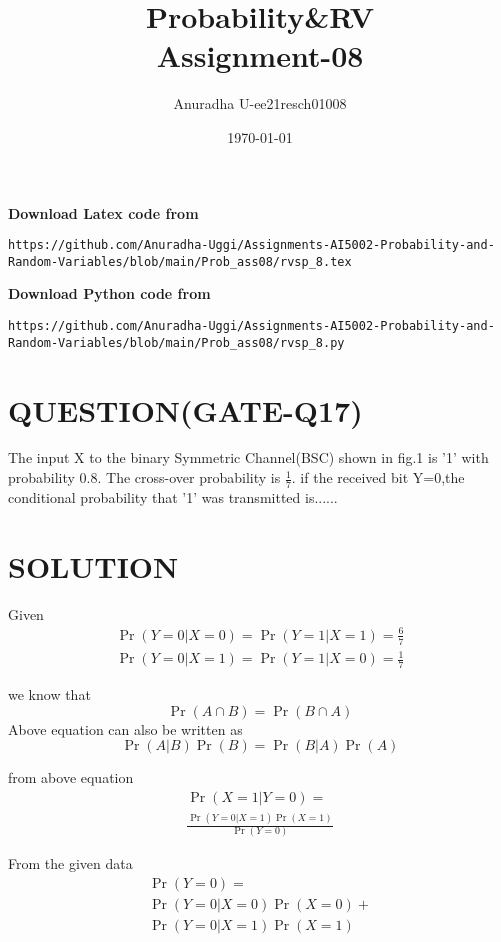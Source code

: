 \documentclass[journal,12pt,twocolumn]{IEEEtran}
\title{Probability\&RV \\ Assignment-08}
\author{Anuradha U-ee21resch01008}
\date{\today}
\begin{document}
\maketitle
\newpage
\bigskip
\renewcommand{\thefigure}{\theenumi}
\renewcommand{\thetable}{\theenumi}


\textbf{Download Latex code from}
\begin{lstlisting}
https://github.com/Anuradha-Uggi/Assignments-AI5002-Probability-and-Random-Variables/blob/main/Prob_ass08/rvsp_8.tex
\end{lstlisting}

\textbf{Download Python code from}
\begin{lstlisting}
https://github.com/Anuradha-Uggi/Assignments-AI5002-Probability-and-Random-Variables/blob/main/Prob_ass08/rvsp_8.py
\end{lstlisting}

\section{\textbf{QUESTION(GATE-Q17)}}
The input X to the binary Symmetric Channel(BSC) shown in fig.1 is '1' with probability 0.8. The cross-over probability is $\frac{1}{7}$. if the received bit Y=0,the conditional probability that '1' was transmitted is......

\section{\textbf{SOLUTION}}
Given 
\begin{gather}
 \Pr{(Y=0|X=0)}=\Pr{(Y=1|X=1)}= \frac{6}{7}\\
 \Pr{(Y=0|X=1)}=\Pr{(Y=1|X=0)}=\frac{1}{7}
\end{gather}

we know that
\begin{equation}
 \Pr{(A\cap B)}=\Pr{(B\cap A)}
\end{equation}
Above equation can also be written as
\begin{equation}
    \Pr{(A|B)}\Pr{(B)}=\Pr{(B|A)}\Pr{(A)}
\end{equation}

from above equation
\begin{multline}
    \Pr{(X=1|Y=0)}=\\
    \frac{\Pr{(Y=0|X=1)}\Pr{(X=1)}}{\Pr{(Y=0)}}
\end{multline}

From the given data
\begin{multline}
 \Pr{(Y=0)}=\\
 \Pr{(Y=0|X=0)}\Pr{(X=0)}+\\
 \Pr{(Y=0|X=1)}\Pr{(X=1)}
\end{multline}
\end{document}
